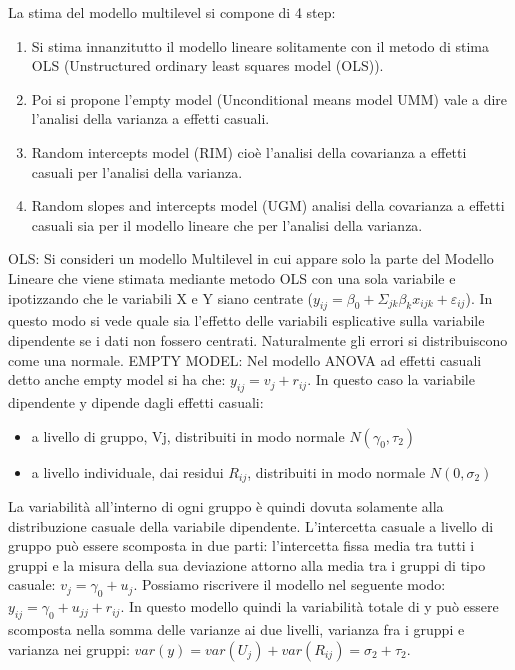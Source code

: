 \documentclass[a4page, 11pt]{article}
\begin{document}
La stima del modello multilevel si compone di 4 step:
\begin{enumerate}[noitemsep]
\item Si stima innanzitutto il modello lineare solitamente con il metodo di stima OLS (Unstructured ordinary least squares model (OLS)).
\item Poi si propone l’empty model (Unconditional means model UMM) vale a dire l’analisi della varianza a effetti casuali.
\item Random intercepts model (RIM) cioè l’analisi della covarianza a effetti casuali per l’analisi della varianza.
\item Random slopes and intercepts model (UGM) analisi della covarianza a effetti casuali sia per il modello lineare che per l’analisi della varianza.
\end{enumerate}
OLS: 
Si consideri un modello Multilevel in cui appare solo la parte del Modello Lineare che viene stimata mediante metodo OLS con una sola variabile e ipotizzando che le variabili X e Y siano centrate ($y_{ij}= \beta_0+\Sigma_{jk} \beta_k x_{ijk}+\varepsilon_{ij}$).
\newline
In questo modo si vede quale sia l’effetto delle variabili esplicative sulla variabile dipendente se i dati non fossero centrati. Naturalmente gli errori si distribuiscono come una normale. 
\newline
\newline
EMPTY MODEL:
Nel modello ANOVA ad effetti casuali detto anche empty model si ha che: $y_{ij}=v_j+r_{ij}$.
In questo caso la variabile dipendente y dipende dagli effetti casuali:
\begin{itemize}
\item a livello di gruppo, Vj, distribuiti in modo normale $N(\gamma_0, \tau_2)$
\item a livello individuale, dai residui $R_{ij}$, distribuiti in modo normale $N(0, \sigma_2)$ 
\end{itemize}
La variabilità all’interno di ogni gruppo è quindi dovuta solamente alla distribuzione casuale della variabile dipendente.
\newline
L’intercetta casuale a livello di gruppo può essere scomposta in due parti: l’intercetta fissa media tra tutti i gruppi e la misura della sua deviazione attorno alla media tra i gruppi di tipo casuale: $v_j=\gamma_0+u_j$.
\newline
Possiamo riscrivere il modello nel seguente modo: $y_{ij}=\gamma_0+u_{jj}+r_{ij}$.
\newline
In questo modello quindi la variabilità totale di y può essere scomposta nella somma delle varianze ai due livelli, varianza fra i gruppi e varianza nei gruppi: $var(y)=var(U_j)+var(R_{ij})=\sigma_2+\tau_2$.
\end{document}
